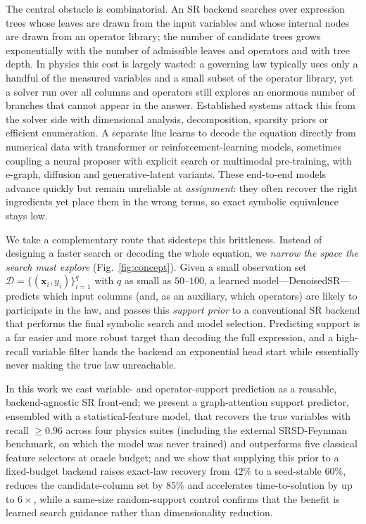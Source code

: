 \documentclass[11pt]{article}
\begin{document}
The central obstacle is combinatorial. An SR backend searches over expression trees
whose leaves are drawn from the input variables and whose internal nodes are drawn
from an operator library; the number of candidate trees grows exponentially with
the number of admissible leaves and operators and with tree
depth\cite{lafuente2024srbench,petersen2021deep}. In physics this cost is largely
wasted: a governing law typically uses only a handful of the measured variables and
a small subset of the operator library, yet a solver run over all columns and
operators still explores an enormous number of branches that cannot appear in the
answer. Established systems attack this from the solver side with dimensional
analysis, decomposition, sparsity priors or efficient
enumeration\cite{brunton2016sindy,rudy2017pde,udrescu2020aifeynman,ruan2026pse}.
A separate line learns to decode the equation directly from numerical data with
transformer or reinforcement-learning
models\cite{biggio2021nesymres,kamienny2022endtoend,landajuela2022dso,dascoli2022deep},
sometimes coupling a neural proposer with explicit
search\cite{shojaee2024tpsr,kamienny2023deep} or multimodal
pre-training\cite{meidani2024snip,li2024mmsr}, with e-graph, diffusion and
generative-latent variants\cite{zheng2025egen,bastiani2025diffusion,li2026gensr}.
These end-to-end models advance quickly but remain unreliable at \emph{assignment}:
they often recover the right ingredients yet place them in the wrong terms, so
exact symbolic equivalence stays low.

We take a complementary route that sidesteps this brittleness. Instead of designing
a faster search or decoding the whole equation, we \emph{narrow the space the
search must explore} (Fig.~\ref{fig:concept}). Given a small observation set
$\mathcal{D}=\{(\mathbf{x}_i,y_i)\}_{i=1}^{q}$ with $q$ as small as $50$--$100$, a
learned model---DenoisedSR---predicts which input columns (and, as an auxiliary,
which operators) are likely to participate in the law, and passes this
\emph{support prior} to a conventional SR backend that performs the final symbolic
search and model selection. Predicting support is a far easier and more robust
target than decoding the full expression, and a high-recall variable filter hands
the backend an exponential head start while essentially never making the true law
unreachable.

In this work we cast variable- and operator-support prediction as a reusable,
backend-agnostic SR front-end; we present a graph-attention support predictor,
ensembled with a statistical-feature model, that recovers the true variables with
recall $\ge 0.96$ across four physics suites (including the external SRSD-Feynman
benchmark, on which the model was never trained) and outperforms five classical
feature selectors at oracle budget; and we show that supplying this prior to a
fixed-budget backend raises exact-law recovery from $42\%$ to a seed-stable
$60\%$, reduces the candidate-column set by $85\%$ and accelerates time-to-solution
by up to $6\times$, while a same-size random-support control confirms that the
benefit is learned search guidance rather than dimensionality reduction.
\end{document}

